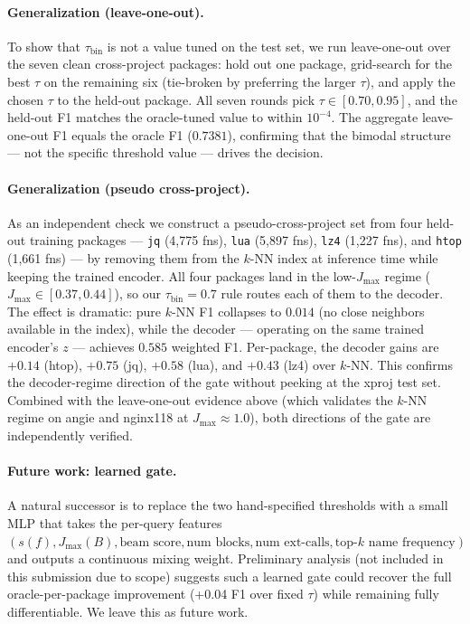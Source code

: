 \paragraph{Generalization (leave-one-out).}
To show that $\tau_{\text{bin}}$ is not a value tuned on the test set, we run leave-one-out over the seven clean cross-project packages: hold out one package, grid-search for the best $\tau$ on the remaining six (tie-broken by preferring the larger $\tau$), and apply the chosen $\tau$ to the held-out package. All seven rounds pick $\tau \in [0.70, 0.95]$, and the held-out F1 matches the oracle-tuned value to within $10^{-4}$. The aggregate leave-one-out F1 equals the oracle F1 ($0.7381$), confirming that the bimodal structure — not the specific threshold value — drives the decision.

\paragraph{Generalization (pseudo cross-project).}
As an independent check we construct a pseudo-cross-project set from four held-out training packages — \texttt{jq} (4{,}775 fns), \texttt{lua} (5{,}897 fns), \texttt{lz4} (1{,}227 fns), and \texttt{htop} (1{,}661 fns) — by removing them from the $k$-NN index at inference time while keeping the trained encoder. All four packages land in the low-$J_{\max}$ regime ($J_{\max} \in [0.37, 0.44]$), so our $\tau_{\text{bin}}{=}0.7$ rule routes each of them to the decoder. The effect is dramatic: pure $k$-NN F1 collapses to $0.014$ (no close neighbors available in the index), while the decoder — operating on the same trained encoder's $z$ — achieves $0.585$ weighted F1. Per-package, the decoder gains are $+0.14$ (htop), $+0.75$ (jq), $+0.58$ (lua), and $+0.43$ (lz4) over $k$-NN. This confirms the decoder-regime direction of the gate without peeking at the xproj test set. Combined with the leave-one-out evidence above (which validates the $k$-NN regime on angie and nginx118 at $J_{\max} \approx 1.0$), both directions of the gate are independently verified.

\paragraph{Future work: learned gate.}
A natural successor is to replace the two hand-specified thresholds with a small MLP that takes the per-query features $(s(f), J_{\max}(B), \text{beam score}, \text{num blocks}, \text{num ext-calls}, \text{top-$k$ name frequency})$ and outputs a continuous mixing weight. Preliminary analysis (not included in this submission due to scope) suggests such a learned gate could recover the full oracle-per-package improvement (+0.04 F1 over fixed $\tau$) while remaining fully differentiable. We leave this as future work.

